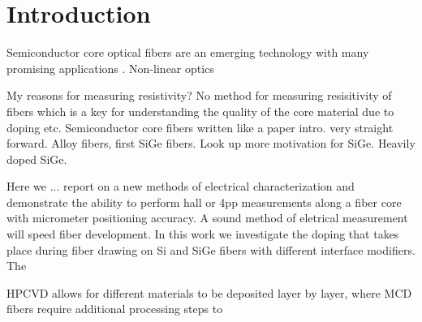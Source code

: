 
\chapter{Introduction}
Semiconductor core optical fibers are an emerging technology with many promising applications 
\cite{Peacock2016SiliconFuture, Ballato2018Perspective:Applications,Healy2018AFibres}. Non-linear optics


\cite{Kingsbury2018JunctionPermselectivity}
My reasons for measuring resistivity? No method for measuring resisitivity of fibers which is a key for understanding the quality of the core material due to doping etc. 
Semiconductor core fibers written like a paper intro. very straight forward. 
Alloy fibers, first SiGe fibers. Look up more motivation for SiGe. Heavily doped SiGe. 

Here we ... report on a new methods of electrical characterization and demonstrate the ability to perform hall or 4pp measurements along a fiber core with micrometer positioning accuracy. A sound method of eletrical measurement will speed fiber development. 
In this work we investigate the doping that takes place during fiber drawing on Si and SiGe fibers with different interface modifiers. The  

HPCVD allows for different materials to be deposited layer by layer, where MCD fibers require additional processing steps to 
\cleardoublepage